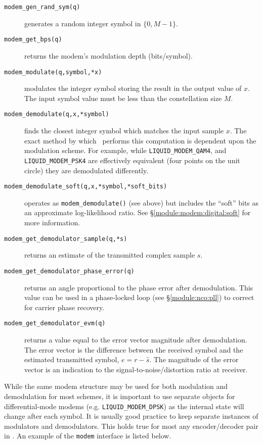 \begin{description}
\item[{\tt modem\_gen\_rand\_sym(q)}]
    generates a random integer symbol in $\{0,M-1\}$.
\item[{\tt modem\_get\_bps(q)}]
    returns the modem's modulation depth (bits/symbol).
\item[{\tt modem\_modulate(q,symbol,*x)}]
    modulates the integer symbol storing the result in the output value
    of $x$.
    The input symbol value must be less than the constellation size $M$.
\item[{\tt modem\_demodulate(q,x,*symbol)}]
    finds the closest integer symbol which matches the input sample $x$.
    The exact method by which \liquid\ performs this computation is
    dependent upon the modulation scheme.
    For example, while
    {\tt LIQUID\_MODEM\_QAM4}, and
    {\tt LIQUID\_MODEM\_PSK4}
    are effectively equivalent (four points on the unit circle)
    they are demodulated differently.
\item[{\tt modem\_demodulate\_soft(q,x,*symbol,*soft\_bits)}]
    operates as {\tt modem\_demodulate()} (see above) but includes the
    ``soft'' bits as an approximate log-likelihood ratio.
    See \S\ref{module:modem:digital:soft} for more information.
\item[{\tt modem\_get\_demodulator\_sample(q,*s)}]
    returns an estimate of the transmitted complex sample $s$.
\item[{\tt modem\_get\_demodulator\_phase\_error(q)}]
    returns an angle proportional to the phase error after demodulation.
    This value can be used in a phase-locked loop
    (see \S\ref{module:nco:pll})
    to correct for carrier phase recovery.
\item[{\tt modem\_get\_demodulator\_evm(q)}]
    returns a value equal to the error vector magnitude after demodulation.
    The error vector is the difference between the received symbol and the
    estimated transmitted symbol, $e = r - \hat{s}$.
    The magnitude of the error vector is an indication to the
    signal-to-noise/distortion ratio at receiver.
\end{description}

While the same modem structure may be used for both modulation and
demodulation for most schemes, it is important to use separate objects
for differential-mode modems (e.g. {\tt LIQUID\_MODEM\_DPSK}) as the internal state
will change after each symbol.
It is usually good practice to keep separate instances of modulators and
demodulators.
This holds true for most any encoder/decoder pair in \liquid.
%
An example of the {\tt modem} interface is listed below.
%

%

